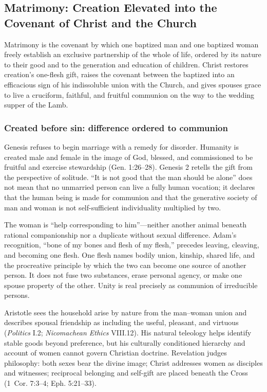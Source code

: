 \subsection{Matrimony: Creation Elevated into the Covenant of Christ and the Church}

Matrimony is the covenant by which one baptized man and one baptized woman freely establish an exclusive partnership of the whole of life, ordered by its nature to their good and to the generation and education of children. Christ restores creation's one-flesh gift, raises the covenant between the baptized into an efficacious sign of his indissoluble union with the Church, and gives spouses grace to live a cruciform, faithful, and fruitful communion on the way to the wedding supper of the Lamb.

\subsubsection{Created before sin: difference ordered to communion}

Genesis refuses to begin marriage with a remedy for disorder. Humanity is created male and female in the image of God, blessed, and commissioned to be fruitful and exercise stewardship (Gen. 1:26--28). Genesis 2 retells the gift from the perspective of solitude. ``It is not good that the man should be alone'' does not mean that no unmarried person can live a fully human vocation; it declares that the human being is made for communion and that the generative society of man and woman is not self-sufficient individuality multiplied by two.

The woman is ``help corresponding to him''---neither another animal beneath rational companionship nor a duplicate without sexual difference. Adam's recognition, ``bone of my bones and flesh of my flesh,'' precedes leaving, cleaving, and becoming one flesh. One flesh names bodily union, kinship, shared life, and the procreative principle by which the two can become one source of another person. It does not fuse two substances, erase personal agency, or make one spouse property of the other. Unity is real precisely as communion of irreducible persons.

Aristotle sees the household arise by nature from the man--woman union and describes spousal friendship as including the useful, pleasant, and virtuous (\emph{Politics} I.2; \emph{Nicomachean Ethics} VIII.12). His natural teleology helps identify stable goods beyond preference, but his culturally conditioned hierarchy and account of women cannot govern Christian doctrine. Revelation judges philosophy: both sexes bear the divine image; Christ addresses women as disciples and witnesses; reciprocal belonging and self-gift are placed beneath the Cross (1~Cor. 7:3--4; Eph. 5:21--33).

